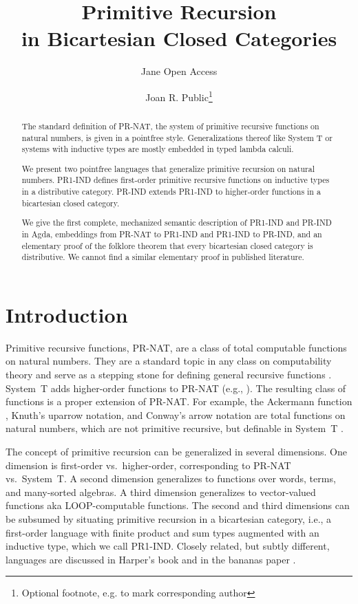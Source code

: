\documentclass[a4paper,USenglish,cleveref, autoref, thm-restate]{lipics-v2021}
\title{Primitive Recursion \\ in Bicartesian Closed Categories} %
\author{Jane {Open Access}}{Dummy University Computing Laboratory, [optional: Address], Country \and My second affiliation, Country \and \url{http://www.myhomepage.edu} }{johnqpublic@dummyuni.org}{https://orcid.org/0000-0002-1825-0097}{}%
\author{Joan R. Public\footnote{Optional footnote, e.g. to mark corresponding author}}{Department of Informatics, Dummy College, [optional: Address], Country}{joanrpublic@dummycollege.org}{[orcid]}{}
\begin{document}
\newcommand\Nat{\ensuremath{\mathbb{N}}}
\newcommand{\many}[2]{{#1}_0,\dots,{#1}_{#2-1}}
\newcommand{\xs}{\many{x}}
\newcommand{\xn}{\xs{n}}

\maketitle

\begin{abstract}
  The standard definition of PR-NAT, the system of primitive recursive functions on natural
  numbers, is given in a pointfree style. Generalizations thereof like
  System T or systems with inductive types are mostly embedded in
  typed lambda calculi.

  We present two pointfree languages that generalize primitive
  recursion on natural numbers. PR1-IND defines
  first-order primitive recursive functions on inductive types in a
  distributive
  category. PR-IND extends PR1-IND to higher-order functions in a
  bicartesian closed category.

  We give the first complete, mechanized semantic description of
  PR1-IND and PR-IND in Agda, embeddings from PR-NAT to PR1-IND and
  PR1-IND to PR-IND, and an elementary proof of the folklore theorem
  that every bicartesian closed category is distributive. We cannot
  find a similar elementary proof in published literature.
\end{abstract}

\section{Introduction}
\label{sec:introduction}

Primitive recursive functions, PR-NAT, are a class of total computable
functions on natural numbers. They are a standard topic in any
class on computability theory and serve as a stepping stone for
defining general recursive functions
\cite{kleene36:_gener_recur_funct_natur_number}.
System~T adds higher-order functions to PR-NAT (e.g.,
\cite[Chapter 9]{DBLP:books/cu/Ha2016}). The resulting class of functions is a
proper extension of PR-NAT. For example, the
Ackermann function \cite{szasz1991machine}, Knuth's uparrow
notation, and Conway's arrow notation are total functions on natural
numbers, which are not primitive recursive, but definable in System~T
\cite{DBLP:journals/corr/Widemann16}.

The concept of primitive recursion can be generalized in several
dimensions. One dimension is first-order vs.\ higher-order,
corresponding to PR-NAT vs.\ System~T. A second dimension generalizes
to functions over words, terms, and many-sorted algebras. A third
dimension generalizes to vector-valued functions aka LOOP-computable
functions. The second and third dimensions can be subsumed by
situating primitive recursion in a bicartesian category, i.e., a
first-order language with finite product and sum types augmented with
an inductive type, which we call PR1-IND.  Closely related, but
subtly different, languages are discussed in Harper's book
\cite[Chapter 15]{DBLP:books/cu/Ha2016} and in the bananas paper
\cite{DBLP:conf/fpca/MeijerFP91}. 
\end{document}
